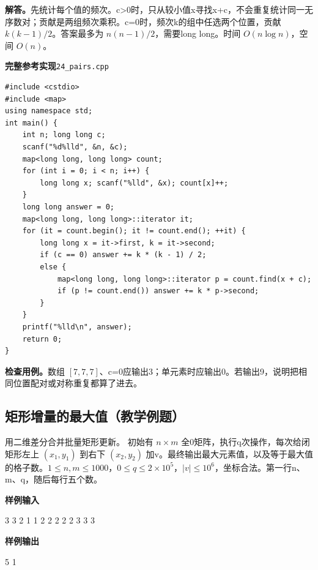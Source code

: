 \documentclass[UTF8,11pt,a4paper,fontset=none]{ctexart}
\begin{document}
\noindent\textbf{解答。}先统计每个值的频次。c>0时，只从较小值x寻找x+c，不会重复统计同一无序数对；贡献是两组频次乘积。c=0时，频次k的组中任选两个位置，贡献 $k(k-1)/2$。答案最多为 $n(n-1)/2$，需要long long。时间 $O(n\log n)$，空间 $O(n)$。
\par\noindent\begin{minipage}{\linewidth}
\textbf{完整参考实现}\quad\texttt{24\_pairs.cpp}
\begin{lstlisting}
#include <cstdio>
#include <map>
using namespace std;
int main() {
    int n; long long c;
    scanf("%d%lld", &n, &c);
    map<long long, long long> count;
    for (int i = 0; i < n; i++) {
        long long x; scanf("%lld", &x); count[x]++;
    }
    long long answer = 0;
    map<long long, long long>::iterator it;
    for (it = count.begin(); it != count.end(); ++it) {
        long long x = it->first, k = it->second;
        if (c == 0) answer += k * (k - 1) / 2;
        else {
            map<long long, long long>::iterator p = count.find(x + c);
            if (p != count.end()) answer += k * p->second;
        }
    }
    printf("%lld\n", answer);
    return 0;
}
\end{lstlisting}
\end{minipage}\par


\noindent\textbf{检查用例。}数组 $[7,7,7]$、c=0应输出3；单元素时应输出0。若输出9，说明把相同位置配对或对称重复都算了进去。

\subsection{矩形增量的最大值（教学例题）}
用二维差分合并批量矩形更新。
初始有 $n\times m$ 全0矩阵，执行q次操作，每次给闭矩形左上 $(x_1,y_1)$ 到右下 $(x_2,y_2)$ 加v。最终输出最大元素值，以及等于最大值的格子数。$1\le n,m\le1000$，$0\le q\le2\times10^5$，$|v|\le10^6$，坐标合法。第一行n、m、q，随后每行五个数。
\begin{tcolorbox}[samplebox,title={输入输出样例}]
\textbf{样例输入}
\begin{Sample}
3 3 2
1 1 2 2 2
2 2 3 3 3
\end{Sample}
\tcblower
\textbf{样例输出}
\begin{Sample}
5 1
\end{Sample}
\end{tcolorbox}
\end{document}
